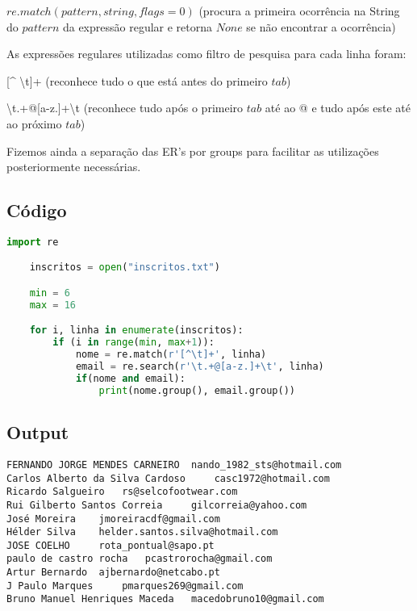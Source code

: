 \documentclass[11pt,a4paper]{report}
\begin{document}
    $re.match(pattern, string, flags=0)$ (procura a primeira ocorrência na String do $pattern$ da expressão regular e retorna $None$ se não encontrar a ocorrência) 

    As expressões regulares utilizadas como filtro de pesquisa para cada linha foram:

[\^{} \textbackslash t]+ (reconhece tudo o que está antes do primeiro $tab$)  

\textbackslash t.+@[a-z.]+\textbackslash t (reconhece tudo após o primeiro $tab$ até ao @ e tudo após este até ao próximo $tab$)

Fizemos ainda a separação das ER's por groups para facilitar as utilizações posteriormente necessárias.
	
    
	
	\subsection{Código}
	\begin{lstlisting}[language=python]
    import re

    inscritos = open("inscritos.txt")

    min = 6 
    max = 16                        

    for i, linha in enumerate(inscritos):
        if (i in range(min, max+1)):
            nome = re.match(r'[^\t]+', linha)
            email = re.search(r'\t.+@[a-z.]+\t', linha) 
            if(nome and email):
                print(nome.group(), email.group())
    \end{lstlisting}
    
    \subsection{Output}

	\begin{verbatim}
FERNANDO JORGE MENDES CARNEIRO 	nando_1982_sts@hotmail.com	
Carlos Alberto da Silva Cardoso 	casc1972@hotmail.com	
Ricardo Salgueiro 	rs@selcofootwear.com	
Rui Gilberto Santos Correia 	gilcorreia@yahoo.com	
José Moreira 	jmoreiracdf@gmail.com	
Hélder Silva 	helder.santos.silva@hotmail.com	
JOSE COELHO 	rota_pontual@sapo.pt	
paulo de castro rocha 	pcastrorocha@gmail.com	
Artur Bernardo 	ajbernardo@netcabo.pt	
J Paulo Marques 	pmarques269@gmail.com	
Bruno Manuel Henriques Maceda 	macedobruno10@gmail.com	
    \end{verbatim}

\pagebreak
\end{document}
